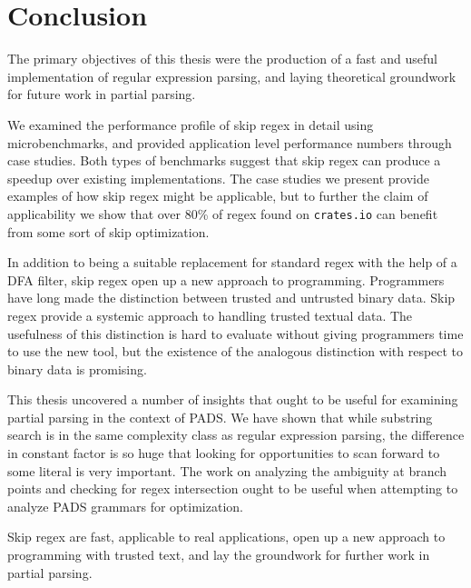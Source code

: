 \chapter{Conclusion}
\label{chapter:conclusion}

The primary objectives of this thesis were the production of a
fast and useful implementation of regular expression parsing,
and laying theoretical groundwork for future work in partial
parsing.

We examined the performance profile of skip regex in detail
using microbenchmarks, and provided application level performance
numbers through case studies. Both types of benchmarks suggest
that skip regex can produce a speedup over existing
implementations. The case studies we present provide examples
of how skip regex might be applicable, but to further
the claim of applicability we show that over 80\% of regex
found on \verb'crates.io' can benefit from some sort of
skip optimization.

In addition to being a suitable replacement for standard
regex with the help of a DFA filter, skip regex open up
a new approach to programming. Programmers have long made
the distinction between trusted and untrusted binary data.
Skip regex provide a systemic approach to handling trusted
textual data. The usefulness of this distinction is hard to
evaluate without giving programmers time to use the new tool,
but the existence of the analogous distinction with respect to
binary data is promising.

This thesis uncovered a number of insights that ought to be
useful for examining partial parsing in the context of PADS.
We have shown that while substring search is in the same complexity
class as regular expression parsing, the difference in constant
factor is so huge that looking for opportunities to scan forward
to some literal is very important. The work on analyzing the
ambiguity at branch points and checking for regex intersection
ought to be useful when attempting to analyze PADS grammars
for optimization.

Skip regex are fast, applicable to real applications, open
up a new approach to programming with trusted text, and lay
the groundwork for further work in partial parsing.
